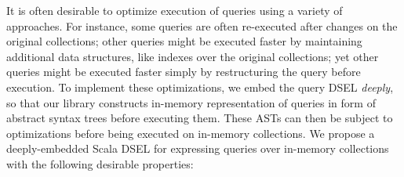 \documentclass{article}
\begin{document}

It is often desirable to optimize execution of queries using a variety
of approaches. For instance, some queries are often re-executed after
changes on the original collections; other queries might be executed
faster by maintaining additional data structures, like indexes over the
original collections; yet other queries might be executed faster simply
by restructuring the query before execution. To implement these
optimizations, we embed the query DSEL \emph{deeply}, so that our
library constructs in-memory representation of queries in form of
abstract syntax trees before executing them. These ASTs can then be
subject to optimizations before being executed on in-memory collections.
We propose a deeply-embedded Scala DSEL for expressing queries over
in-memory collections with the following desirable properties:
\end{document}
